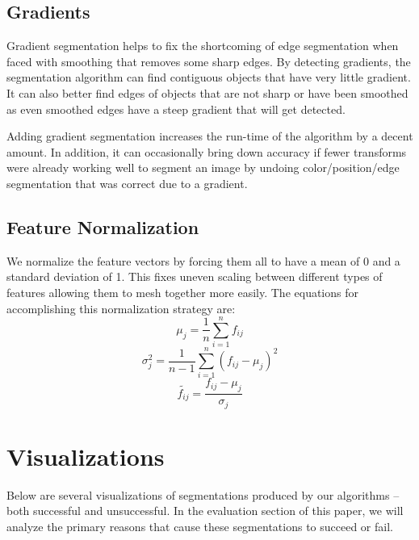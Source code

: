 \documentclass[12pt]{article}
\begin{document}
\subsection{Gradients}
	Gradient segmentation helps to fix the shortcoming of edge segmentation when faced with smoothing that removes some sharp edges. By detecting gradients, the segmentation algorithm can find contiguous objects that have very little gradient. It can also better find edges of objects that are not sharp or have been smoothed as even smoothed edges have a steep gradient that will get detected.
	
	Adding gradient segmentation increases the run-time of the algorithm by a decent amount. In addition, it can occasionally bring down accuracy if fewer transforms were already working well to segment an image by undoing color/position/edge segmentation that was correct due to a gradient.
	
\subsection{Feature Normalization}
	We normalize the feature vectors by forcing them all to have a mean of 0 and a standard deviation of 1. This fixes uneven scaling between different types of features allowing them to mesh together more easily. The equations for accomplishing this normalization strategy are: 
	$$ \mu_j = \frac{1}{n}\sum_{i=1}^{n}f_{ij} $$
	$$ \sigma^2_j = \frac{1}{n-1}\sum_{i=1}^{n}(f_{ij}-\mu_j)^2 $$
	$$ \tilde{f_{ij}} = \frac{f_{ij}-\mu_j}{\sigma_j} $$
	

\section{Visualizations}
Below are several visualizations of segmentations produced by our algorithms -- both successful and unsuccessful. In the evaluation section of this paper, we will analyze the primary reasons that cause these segmentations to succeed or fail.
\end{document}
